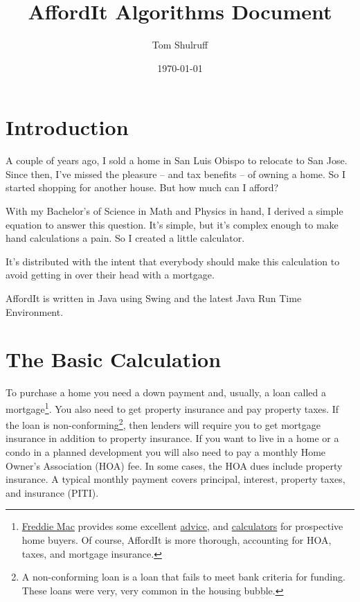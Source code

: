 \documentclass{article}
\title{AffordIt Algorithms Document}
\author{Tom Shulruff}
\date{\today}
\begin{document}
\maketitle

\section{Introduction}

A couple of years ago, I sold a home in San Luis Obispo to relocate
to San Jose.  Since then, I've missed
the pleasure -- and tax benefits -- of owning a home.  So I started
shopping for another house.  But how much can I afford?

With my Bachelor's of Science in Math and Physics in hand, 
I derived a simple equation to answer this question.
It's simple, but it's complex
enough to make hand calculations a pain.  So I created a little
calculator. 

It's distributed with the intent that everybody 
should make this calculation to avoid getting in over their 
head with a mortgage.

AffordIt is written in Java using Swing and the latest
 Java Run Time Environment.  

\section{The Basic Calculation}

To purchase a home you need a down payment and, usually, a loan
called a mortgage\footnote{
\href{http://www.freddiemac.com}{Freddie Mac} 
provides some excellent 
\href{http://www.freddiemac.com/corporate/buying_and_owning.html}{advice}, 
and 
\href{http://www.freddiemac.com/corporate/buyown/english/calcs_tools/}{calculators}  
for prospective home buyers.
Of course, AffordIt is more thorough, accounting for HOA, taxes, and mortgage
 insurance.}.
You also need to get property insurance 
and pay property taxes.  
If the loan is non-conforming\footnote{
A non-conforming loan is a loan that fails to meet bank criteria for 
funding.
These loans were very, very common in the housing bubble.},
then lenders will require you to get mortgage insurance in addition to 
property insurance. If you want to live in a home
or a condo in a planned development you will also need to pay
a monthly Home Owner's Association (HOA) fee. In some cases, the HOA 
dues include
property insurance.
A typical monthly payment covers 
principal, interest, property taxes, and insurance (PITI).  
\end{document}
